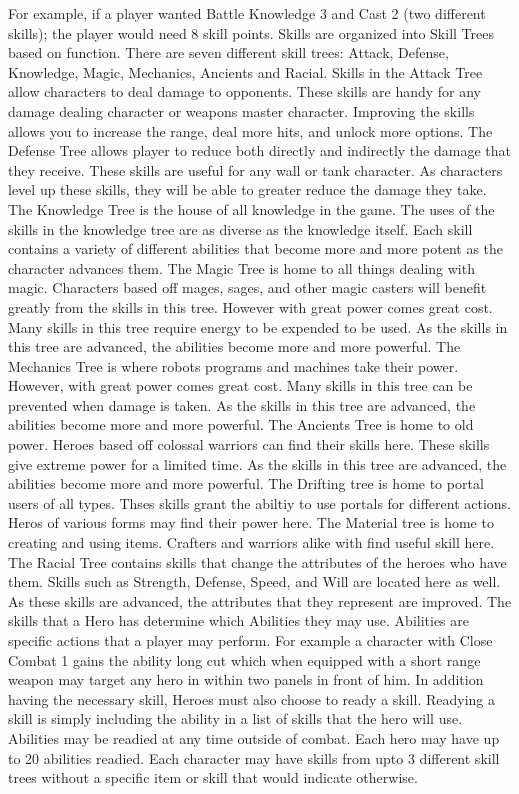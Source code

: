 For example, if a player wanted Battle Knowledge 3 and Cast 2 (two different
skills); the player would need 8 skill points.  Skills are organized into Skill
Trees based on function.  There are seven different skill trees:
Attack, Defense, Knowledge, Magic, Mechanics, Ancients and Racial.  Skills in the
Attack Tree allow characters to deal damage to opponents.  These skills are
handy for any damage dealing character or weapons master character.  Improving
the skills allows you to increase the range, deal more hits, and unlock more
options.  The Defense Tree allows player to reduce both directly and indirectly
the damage that they receive.  These skills are useful for any wall or tank
character.  As characters level up these skills, they will be able to greater
reduce the damage they take.  The Knowledge Tree is the house of all knowledge
in the game.  The uses of the skills in the knowledge tree are as diverse as
the knowledge itself.  Each skill contains a variety of different abilities
that become more and more potent as the character advances them.  The Magic
Tree is home to all things dealing with magic.  Characters based off
mages, sages, and other magic casters will benefit greatly from the skills in
this tree.  However with great power comes great cost.  Many skills in this
tree require energy to be expended to be used.  As the skills in this tree are
advanced, the abilities become more and more powerful.  The Mechanics Tree is
where robots programs and machines take their power.  However, with great power
comes great cost.  Many skills in this tree can be prevented when damage is
taken.  As the skills in this tree are advanced, the abilities become more and
more powerful.  The Ancients Tree is home to old power.  Heroes based off
colossal warriors can find their skills here.  These skills give extreme power
for a limited time.  As the skills in this tree are advanced, the abilities
become more and more powerful.  The Drifting tree is home to portal users of
all types.  Thses skills grant the abiltiy to use portals for different
actions.  Heros of various forms may find their power here.  The Material tree
is home to creating and using items.  Crafters and warriors alike with find
useful skill here. The Racial Tree contains skills that change the
attributes of the heroes who have them.  Skills such as Strength, Defense,
Speed, and Will are located here as well.  As these skills are advanced, the
attributes that they represent are improved.  The skills that a Hero has
determine which Abilities they may use.  Abilities are specific actions that a
player may perform.  For example a character with Close Combat 1 gains the
ability long cut which when equipped with a short range weapon may target any
hero in within two panels in front of him.  In addition having the necessary
skill, Heroes must also choose to ready a skill.  Readying a skill is simply
including the ability in a list of skills that the hero will use.  Abilities
may be readied at any time outside of combat.  Each hero may have up to 20
abilities readied.  Each character may have skills from upto 3 different skill
trees without a specific item or skill that would indicate otherwise.

